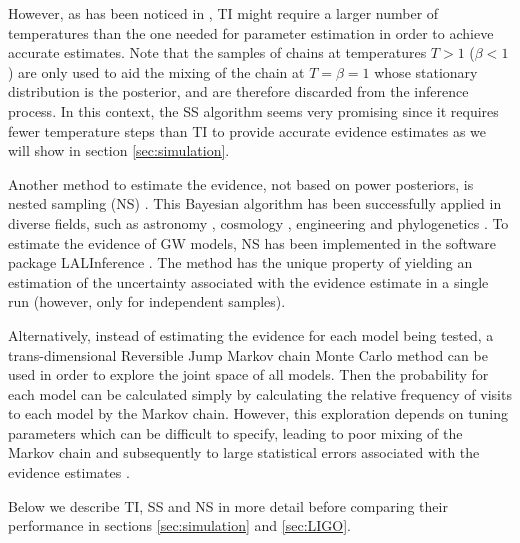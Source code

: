 \documentclass[aps,reprint,amsmath,amssymb,showpacs,showkeys]{revtex4-1}%
\newcommand{\cb}{ \color{blue}}
\begin{document}
However, as has been noticed in \cite{Veitch:2015}, TI might require a larger number of temperatures than the one needed for parameter estimation in order to achieve accurate estimates.  Note that the samples of chains  at  temperatures $T>1$ ($\beta<1$) are only used to aid the mixing of  the chain at $T=\beta=1$ whose stationary distribution is the posterior, and  are therefore discarded from the inference process.  In this context, the SS algorithm seems very promising since  it requires fewer temperature steps than TI to provide accurate evidence estimates as we will show in section \ref{sec:simulation}.

Another method to estimate the evidence,  not based on power posteriors, is nested sampling (NS) \citep{Skilling:2006, Veitch:2010}.  This Bayesian algorithm has been successfully applied in diverse fields, such as astronomy \citep{Brewer:Donovan:2015}, cosmology \citep{Feroz:2009}, engineering \citep{Henderson:2017} and phylogenetics \citep{Maturana:2017b, Maturana:2018}. To estimate the evidence of GW models, NS has been implemented in the software package LALInference \citep{Veitch:2015}.  The method has the unique property of yielding an estimation of the uncertainty associated with the evidence estimate in a single run (however, only for independent samples).

Alternatively, instead of estimating the evidence for each model being tested, a trans-dimensional Reversible Jump Markov chain Monte Carlo \citep[RJMCMC;][]{Green:1995, Umstatter:2005} method can be used in order to explore the joint space of all models.  Then the probability for each model can be calculated simply by calculating the relative frequency of visits to each model by the Markov chain.  However, this exploration depends on tuning parameters which can be difficult to specify, leading to poor mixing of the Markov chain and subsequently to large statistical errors associated with the evidence estimates \citep{Cornish:2014}.


Below we describe TI, SS and NS in more detail before comparing their performance in sections \ref{sec:simulation} and \ref{sec:LIGO}.
\end{document}
